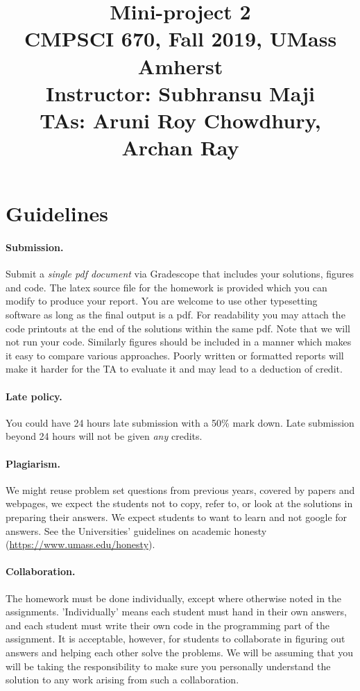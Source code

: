 \documentclass[10pt,letterpaper]{article}
\title{
  \textbf{Mini-project 2} \\
  \Large{CMPSCI 670, Fall 2019, UMass Amherst} \\
  \Large{Instructor: Subhransu Maji} \\
  \Large{TAs: Aruni Roy Chowdhury, Archan Ray}
}
\date{}
\begin{document}
\maketitle

\renewcommand\thesubsection{\thesection.\alph{subsection}}


\section*{Guidelines}

\paragraph{Submission.} Submit a \emph{single pdf document} via Gradescope that includes your solutions, figures and code. The latex source file for the homework is provided which you can modify to produce your report. You are welcome to use other typesetting software as long as the final output is a pdf. For readability you may attach the code printouts at the end of the solutions within the same pdf. Note that we will not run your code. Similarly figures should be included in a manner which makes it easy to compare various approaches. Poorly written or formatted reports will make it harder for the TA to evaluate it and may lead to a deduction of credit. 

\paragraph{Late policy.} You could have 24 hours late submission with a 50\% mark down. Late submission beyond 24 hours will not be given \emph{any} credits. 

\paragraph{Plagiarism.} We might reuse problem set questions from previous years, covered by papers and webpages, we expect the students not to copy, refer to, or look at the solutions in preparing their answers. We expect students to want to learn and not google for answers. See the Universities' guidelines on academic honesty (\url{https://www.umass.edu/honesty}).

\paragraph{Collaboration.} The homework must be done individually, except where otherwise noted in the assignments. 'Individually' means each student must hand in their own answers, and each student must write their own code in the programming part of the assignment. It is acceptable, however, for students to collaborate in figuring out answers and helping each other solve the problems. We will be assuming that you will be taking the responsibility to make sure you personally understand the solution to any work arising from such a collaboration. 
\end{document}
